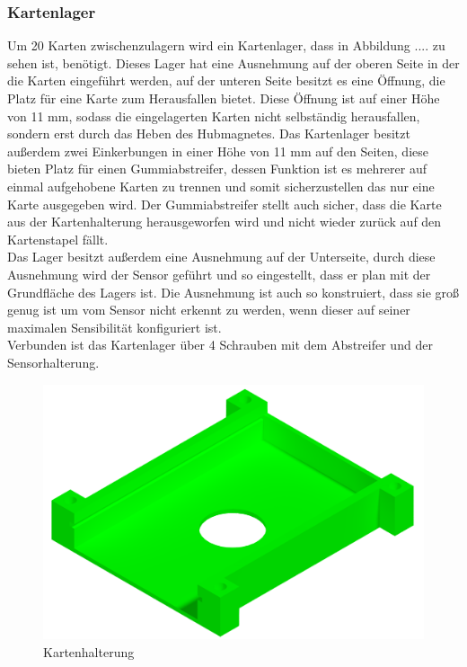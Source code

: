 \subsubsection{Kartenlager}

Um 20 Karten zwischenzulagern wird ein Kartenlager, dass in Abbildung .... zu sehen ist, benötigt. Dieses Lager hat eine Ausnehmung auf der oberen Seite in der die Karten
eingeführt werden, auf der unteren Seite besitzt es eine Öffnung, die Platz für eine Karte zum Herausfallen bietet. Diese Öffnung ist auf
einer Höhe von 11 mm, sodass die eingelagerten Karten nicht selbständig  herausfallen, sondern erst durch das Heben des Hubmagnetes.
Das Kartenlager besitzt außerdem zwei Einkerbungen in einer Höhe von 11 mm auf den Seiten, diese bieten Platz für einen Gummiabstreifer,
dessen Funktion ist es mehrerer auf einmal aufgehobene Karten zu trennen und somit sicherzustellen das nur eine Karte ausgegeben wird.
Der Gummiabstreifer stellt auch sicher, dass die Karte aus der Kartenhalterung herausgeworfen wird und nicht wieder zurück auf den Kartenstapel
fällt. \\
Das Lager besitzt außerdem eine Ausnehmung auf der Unterseite, durch diese Ausnehmung wird der Sensor geführt und so eingestellt,
dass er plan mit der Grundfläche des Lagers ist. Die Ausnehmung ist auch so konstruiert, dass sie groß genug ist um vom Sensor
nicht erkennt zu werden, wenn dieser auf seiner maximalen Sensibilität konfiguriert ist.\\
Verbunden ist das Kartenlager über 4 Schrauben mit dem Abstreifer und der Sensorhalterung.

\begin{figure}
    \centering
    \includegraphics[scale=0.5,page=1]{fig/mech/Kartenhalterung.PNG}
    \caption{Kartenhalterung}
\end{figure}

